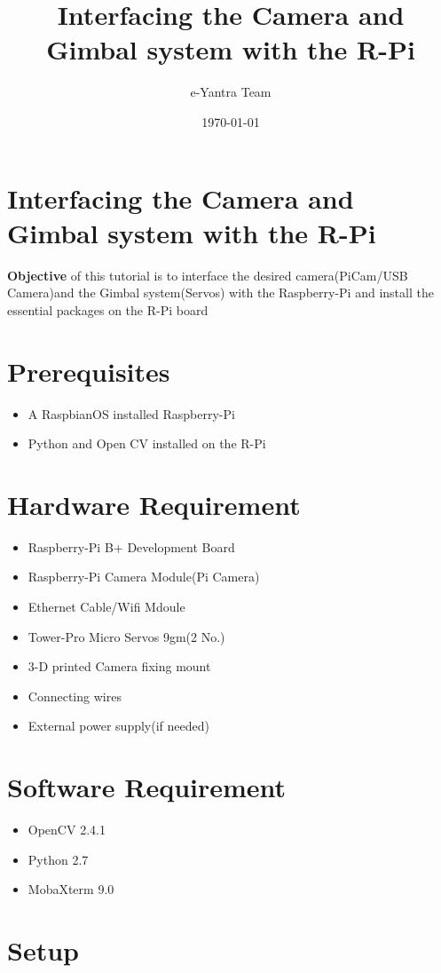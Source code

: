 \documentclass[11pt,a4paper]{article}
\title{Interfacing the Camera and Gimbal system with the R-Pi}
\author{e-Yantra Team}
\date{\today}
\begin{document}
	\maketitle
	\newpage
	\tableofcontents
	\newpage
	\section{Interfacing the Camera and Gimbal system with the R-Pi}
	\textbf{Objective} of this tutorial is to interface the desired camera(PiCam/USB Camera)and the Gimbal system(Servos) with the Raspberry-Pi and install the essential packages on the R-Pi board 
	\section{Prerequisites}
	\begin{itemize}
		\item A RaspbianOS installed Raspberry-Pi 
		\item Python and Open CV installed on the R-Pi
	\end{itemize}
	\section{Hardware Requirement}
	\begin{itemize}
		\item Raspberry-Pi B+ Development Board
		\item Raspberry-Pi Camera Module(Pi Camera)
		\item Ethernet Cable/Wifi Mdoule
		\item Tower-Pro Micro Servos 9gm(2 No.)
		\item 3-D printed Camera fixing mount
		\item Connecting wires
		\item External power supply(if needed)
	\end{itemize}
	\section{Software Requirement}
	\begin{itemize}
		\item OpenCV 2.4.1
		\item Python 2.7
		\item MobaXterm 9.0
	\end{itemize}
	\section{Setup}
		
\end{document}
